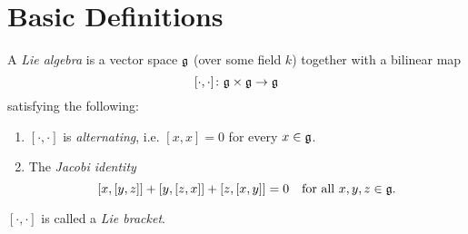 \section{Basic Definitions}

\begin{defi}
 A \emph{Lie algebra} is a vector space $\mathfrak{g}$ (over some field $k$) together with a bilinear map
 \[
  [\cdot, \cdot] \colon \mathfrak{g} \times \mathfrak{g} \to \mathfrak{g}
 \]
 satisfying the following:
 \begin{enumerate}
  \item
   $[\cdot, \cdot]$ is \emph{alternating}, i.e. $[x,x] = 0$ for every $x \in \mathfrak{g}$.
  \item
   The \emph{Jacobi identity}
   \[
    [x,[y,z]] + [y,[z,x]] + [z,[x,y]] = 0
    \quad
    \text{for all $x,y,z \in \mathfrak{g}$}.
   \]
 \end{enumerate}
 $[\cdot,\cdot]$ is called a \emph{Lie bracket}.
\end{defi}
